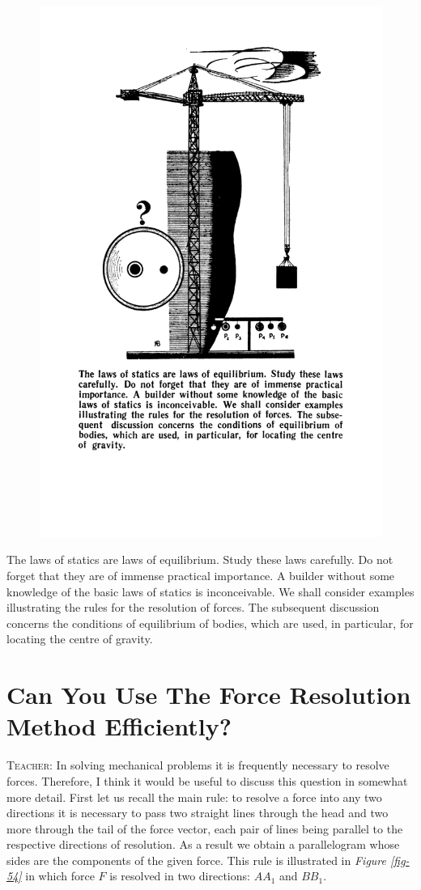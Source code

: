 \documentclass[a4paper,sfsidenotes]{tufte-book}
\begin{document}
\begin{figure}
\centering
\includegraphics[width=0.65\linewidth]{sec-f.pdf}
\end{figure}
\begin{fullwidth}
\begin{Large}
The laws of statics are laws of equilibrium. Study these laws carefully. Do not forget that they are of immense practical importance. A builder without some knowledge of the basic laws of statics is inconceivable. We shall consider examples illustrating the rules for the resolution of forces. The subsequent discussion concerns the conditions of equilibrium of bodies, which are used, in particular, for locating the centre of gravity.
\end{Large}
\end{fullwidth}


\chapter{Can You Use The Force Resolution Method Efficiently?}
\label{ch-13}

\textsc{Teacher:} In solving mechanical problems it is frequently necessary to resolve forces. Therefore, I think it would be useful to discuss this question in somewhat more detail. First let us recall the main rule: to resolve a force into any two directions it is necessary to pass two straight lines through the head and two more through the tail of the force vector, each pair of lines being parallel to the respective directions of resolution. As a result we obtain a parallelogram whose sides are the components of the given force. This rule is illustrated in \emph{Figure \ref{fig-54}} in which force $F$ is resolved in two directions: $AA_{1}$ and $BB_{1}$. 
\end{document}
